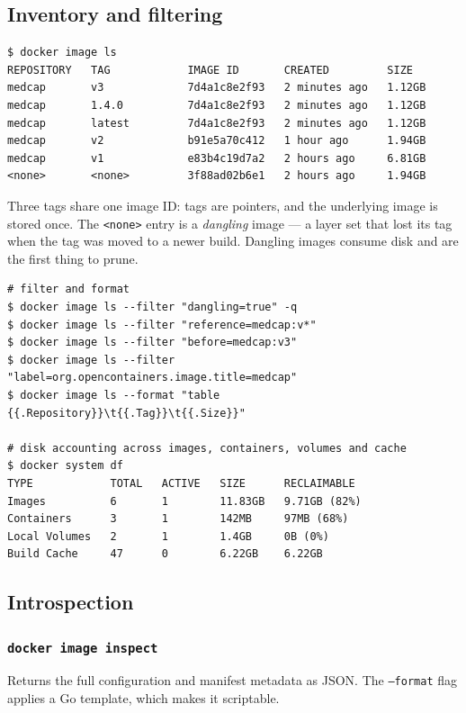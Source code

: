 \documentclass[10pt,a4paper]{article}
\newcommand{\cmd}[1]{\texttt{\small #1}}
\begin{document}
\subsection{Inventory and filtering}

\begin{lstlisting}[style=shell]
$ docker image ls
REPOSITORY   TAG            IMAGE ID       CREATED         SIZE
medcap       v3             7d4a1c8e2f93   2 minutes ago   1.12GB
medcap       1.4.0          7d4a1c8e2f93   2 minutes ago   1.12GB
medcap       latest         7d4a1c8e2f93   2 minutes ago   1.12GB
medcap       v2             b91e5a70c412   1 hour ago      1.94GB
medcap       v1             e83b4c19d7a2   2 hours ago     6.81GB
<none>       <none>         3f88ad02b6e1   2 hours ago     1.94GB
\end{lstlisting}

Three tags share one image ID: tags are pointers, and the underlying
image is stored once. The \texttt{<none>} entry is a \emph{dangling}
image --- a layer set that lost its tag when the tag was moved to a
newer build. Dangling images consume disk and are the first thing to
prune.

\begin{lstlisting}[style=shell]
# filter and format
$ docker image ls --filter "dangling=true" -q
$ docker image ls --filter "reference=medcap:v*"
$ docker image ls --filter "before=medcap:v3"
$ docker image ls --filter "label=org.opencontainers.image.title=medcap"
$ docker image ls --format "table {{.Repository}}\t{{.Tag}}\t{{.Size}}"

# disk accounting across images, containers, volumes and cache
$ docker system df
TYPE            TOTAL   ACTIVE   SIZE      RECLAIMABLE
Images          6       1        11.83GB   9.71GB (82%)
Containers      3       1        142MB     97MB (68%)
Local Volumes   2       1        1.4GB     0B (0%)
Build Cache     47      0        6.22GB    6.22GB
\end{lstlisting}

\subsection{Introspection}

\subsubsection{\cmd{docker image inspect}}

Returns the full configuration and manifest metadata as JSON. The
\cmd{--format} flag applies a Go template, which makes it scriptable.
\end{document}
